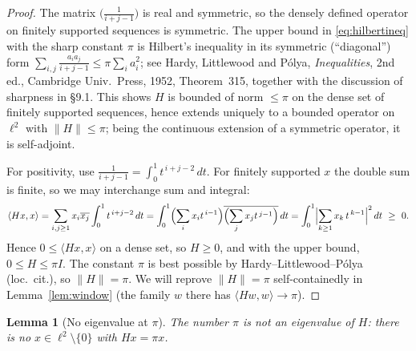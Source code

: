 \documentclass[12pt]{article}
\newtheorem{lemma}{Lemma}
\theoremstyle{remark}
\begin{document}
\begin{proof}
The matrix $\bigl(\tfrac1{i+j-1}\bigr)$ is real and symmetric, so the densely defined operator
on finitely supported sequences is symmetric. The upper bound in \eqref{eq:hilbertineq} with the
sharp constant $\pi$ is Hilbert's inequality in its symmetric (``diagonal'') form
$\sum_{i,j}\frac{a_i a_j}{i+j-1}\le\pi\sum_i a_i^2$; see Hardy, Littlewood and P\'olya,
\emph{Inequalities}, 2nd ed., Cambridge Univ.\ Press, 1952, Theorem~315, together with the
discussion of sharpness in \S9.1. This shows $H$ is bounded of norm $\le\pi$ on the dense set of
finitely supported sequences, hence extends uniquely to a bounded operator on $\ell^2$ with
$\|H\|\le\pi$; being the continuous extension of a symmetric operator, it is self-adjoint.

For positivity, use $\frac1{i+j-1}=\int_0^1 t^{\,i+j-2}\,dt$. For finitely supported $x$ the
double sum is finite, so we may interchange sum and integral:
\[
\langle Hx,x\rangle=\sum_{i,j\ge1}x_i\overline{x_j}\int_0^1 t^{\,i+j-2}\,dt
=\int_0^1\Bigl(\sum_{i}x_i t^{\,i-1}\Bigr)\overline{\Bigl(\sum_{j}x_j t^{\,j-1}\Bigr)}\,dt
=\int_0^1\Bigl|\sum_{k\ge1}x_k\,t^{\,k-1}\Bigr|^2\,dt\ \ge\ 0 .
\]
Hence $0\le\langle Hx,x\rangle$ on a dense set, so $H\ge0$, and with the upper bound,
$0\le H\le\pi I$. The constant $\pi$ is best possible by Hardy--Littlewood--P\'olya
(loc.\ cit.), so $\|H\|=\pi$. We will reprove $\|H\|=\pi$ self-containedly in
Lemma~\ref{lem:window} (the family $w$ there has $\langle Hw,w\rangle\to\pi$).
\end{proof}

\begin{lemma}[No eigenvalue at $\pi$]\label{lem:spec}
The number $\pi$ is not an eigenvalue of $H$: there is no $x\in\ell^2\setminus\{0\}$ with
$Hx=\pi x$.
\end{lemma}
\end{document}
